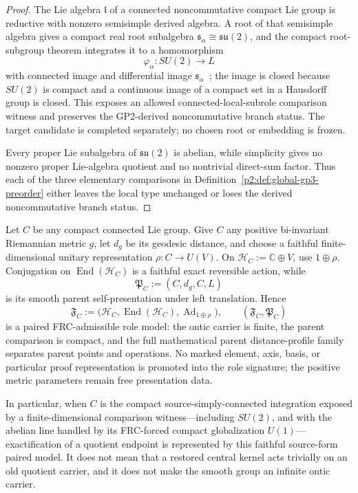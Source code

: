 \documentclass[12pt,a4paper]{article}
\begin{document}
\begin{proof}
The Lie algebra \(\mathfrak l\) of a connected noncommutative compact Lie
group is reductive with nonzero semisimple derived algebra.  A root of that
semisimple algebra gives a compact real root subalgebra
\(\mathfrak s_\alpha\cong\mathfrak{su}(2)\), and the compact root-subgroup
theorem integrates it to a homomorphism
\[
        \varphi_\alpha:SU(2)\longrightarrow L
\]
with connected image and differential image
\(\mathfrak s_\alpha\)~\cite{Hall2015lie}; the image is closed because
\(SU(2)\) is compact and a continuous image of a compact set in a Hausdorff
group is closed.  This exposes an allowed connected-local-subrole comparison
witness and preserves the GP2-derived noncommutative branch status.  The
target candidate is completed separately; no chosen root or embedding is
frozen.

Every proper Lie subalgebra of \(\mathfrak{su}(2)\) is abelian, while
simplicity gives no nonzero proper Lie-algebra quotient and no nontrivial
direct-sum factor.  Thus each of the three elementary comparisons in
Definition~\ref{p2:def:global-gp3-preorder} either leaves the local type
unchanged or loses the derived noncommutative branch status.
\end{proof}

\begin{lemma}
\label{p2:lem:relation-exact-endpoint-models}
Let \(C\) be any compact connected Lie group.  Give \(C\) any positive
bi-invariant Riemannian metric \(g\), let
\(d_g\) be its geodesic distance, and choose a faithful finite-dimensional
unitary representation \(\rho:C\to U(V)\).  On
\(\mathcal H_C:=\mathbb C\oplus V\), use \(1\oplus\rho\).  Conjugation on
\(\operatorname{End}(\mathcal H_C)\) is a faithful exact reversible action,
while
\[
        \mathfrak P_C:=(C,d_g,C,L)
\]
is its smooth parent self-presentation under left translation.  Hence
\[
 \mathfrak F_C
 :=\bigl(\mathcal H_C,\operatorname{End}(\mathcal H_C),
          \operatorname{Ad}_{1\oplus\rho}\bigr),
 \qquad
 (\mathfrak F_C,\mathfrak P_C)
\]
is a paired FRC-admissible role model: the ontic carrier is finite, the parent
comparison is compact, and the full mathematical parent distance-profile
family separates parent points and operations.  No marked element, axis,
basis, or particular proof representation is promoted into the role
signature; the positive metric parameters remain free presentation data.

In particular, when \(C\) is the compact source-simply-connected
integration exposed by a finite-dimensional comparison witness---including \(SU(2)\),
and with the abelian line handled by its FRC-forced compact globalization
\(U(1)\)---exactification of a quotient endpoint is represented by this
faithful source-form paired model.  It does not mean that a restored central
kernel acts trivially on an old quotient carrier, and it does not make the
smooth group an infinite ontic carrier.
\end{lemma}
\end{document}

